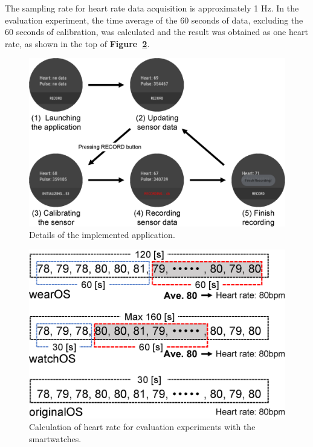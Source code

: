 \documentclass[sigchi,authordraft]{acmart}
\newcommand\figref[1]{\textbf{Figure~\ref{fig:#1}}}
\begin{document}
The sampling rate for heart rate data acquisition is approximately 1 Hz. In the evaluation experiment, the time average of the 60 seconds of data, excluding the 60 seconds of calibration, was calculated and the result was obtained as one heart rate, as shown in the top of \figref{calculating_heart_rate}.

\begin{figure}[!t]
  \centering
  \includegraphics[width=1\linewidth]{figures/app.eps}
  \caption{Details of the implemented application.}
  \label{fig:app}
\end{figure}

\begin{figure}[!t]
  \centering
  \includegraphics[width=1\linewidth]{figures/calculate_heart_rate.eps}
  \caption{Calculation of heart rate for evaluation experiments with the smartwatches.}
  \label{fig:calculating_heart_rate}
\end{figure}
\end{document}
